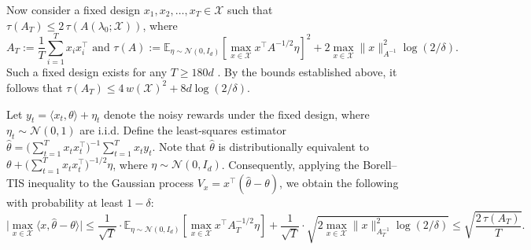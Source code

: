 Now consider a fixed design $x_1,x_2,\ldots,x_T\in\mathcal{X}$ such that $\tau(A_T)\le 2\,\tau(A(\lambda_0;\mathcal{X}))$, where
$$A_T := \frac{1}{T}\sum_{i=1}^T x_i x_i^\top \text{ and }
\tau(A) := \mathbb{E}_{\eta\sim\mathcal{N}(0,I_d)}\!\left[\max_{x\in\mathcal{X}} x^\top A^{-1/2}\eta\right]^2 + 2\max_{x\in\mathcal{X}}\|x\|_{A^{-1}}^2 \log(2/\delta).$$
Such a fixed design exists for any $T\ge 180d$ \citep{katz2020empirical,allen2021near}.
By the bounds established above, it follows that $\tau(A_T)\le 4\,w(\mathcal{X})^2 + 8d\log(2/\delta)$.




Let $y_t=\langle x_t,\theta\rangle+\eta_t$ denote the noisy rewards under the fixed design, where $\eta_t\sim\mathcal{N}(0,1)$ are i.i.d.
Define the least-squares estimator
$\widehat{\theta}=\bigl(\sum_{t=1}^T x_t x_t^\top\bigr)^{-1}\sum_{t=1}^T x_t y_t$.
Note that $\widehat{\theta}$ is distributionally equivalent to $\theta+\bigl(\sum_{t=1}^T x_t x_t^\top\bigr)^{-1/2}\eta$, where $\eta\sim\mathcal{N}(0,I_d)$.
Consequently, applying the Borell--TIS inequality to the Gaussian process $V_x = x^\top(\widehat{\theta}-\theta)$, we obtain the following with probability at least $1-\delta$:
\begin{equation*}
\Big|\max_{x\in\mathcal{X}}\langle x,\widehat{\theta}-\theta\rangle\Big|
\le \frac{1}{\sqrt{T}}\cdot \mathbb{E}_{\eta\sim\mathcal{N}(0,I_d)}\!\left[\max_{x\in\mathcal{X}} x^\top A_T^{-1/2}\eta\right]
+ \frac{1}{\sqrt{T}}\cdot \sqrt{2\max_{x\in\mathcal{X}}\|x\|_{A_T^{-1}}^2\log(2/\delta)}
\le \sqrt{\frac{2\,\tau(A_T)}{T}}.
\end{equation*}



